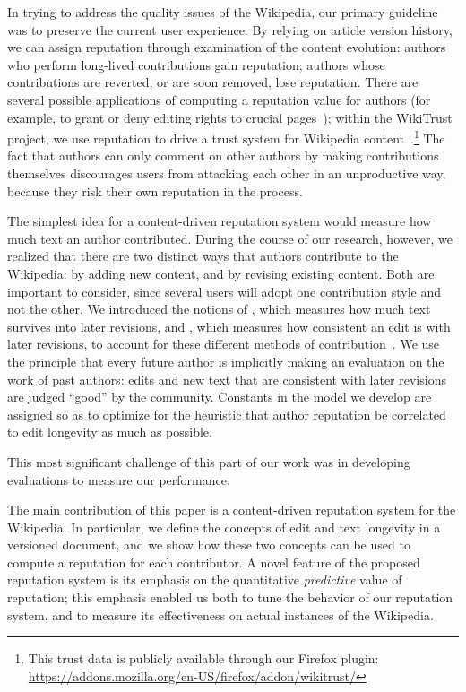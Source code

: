 In trying to address the quality issues of the Wikipedia,
our primary guideline was to preserve the current user experience.
By relying on article version history, we can assign reputation
through examination of the content evolution:
authors who perform long-lived contributions gain reputation; authors
whose contributions are reverted, or are soon removed, lose reputation.
There are several possible applications of computing a reputation
value for authors (for example, to grant or deny editing rights to
crucial pages~\cite{Blaze1996}); within the WikiTrust project,
we use reputation to drive a trust system for
Wikipedia content~\cite{Adler2008}.\footnote{This trust data
is publicly available through our Firefox plugin:
\url{https://addons.mozilla.org/en-US/firefox/addon/wikitrust/}}
The fact that authors can only comment on other authors by
making contributions themselves discourages users from attacking
each other in an unproductive way, because they risk their own reputation in the process.


The simplest idea for a content-driven reputation system would measure
how much text an author contributed.
During the course of our research, however, we realized that there are
two distinct ways that authors contribute to the Wikipedia: by adding
new content, and by revising existing content.
Both are important to consider, since several users will
adopt one contribution style and not the other.
We introduced the notions of
, which measures how much text survives
into later revisions, and , which measures
how consistent an edit is with later revisions,
to account for these different methods of contribution~\cite{Adler2007}.
We use the principle that every future author is
implicitly making an evaluation on the work of past authors:
edits and new text that are consistent with later revisions
are judged ``good'' by the community.
Constants in the model we develop are assigned so as to optimize
for the heuristic that author reputation
be correlated to edit longevity as much as possible.

This most significant challenge of this part of our work
was in developing evaluations to measure our performance.

The main contribution of this paper is a content-driven reputation
system for the Wikipedia. 
In particular, we define the concepts of edit and text longevity in a
versioned document, and we show how these two concepts can be used to
compute a reputation for each contributor. 
A novel feature of the proposed reputation system is its emphasis on
the quantitative {\em predictive\/} value of reputation; this emphasis
enabled us both to tune the behavior of our reputation system, and to
measure its effectiveness on actual instances of the Wikipedia. 

